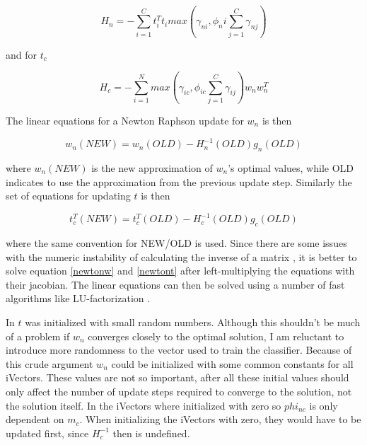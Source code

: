 \begin{equation}\label{jacobianw}
H_n = -\sum_{i=1}^Ct_i^Tt_imax(\gamma_{ni}, \phi_ni\sum_{j=1}^C\gamma_{nj})
\end{equation}

and for $t_c$

\begin{equation}\label{jacobiant}
H_c= -\sum_{i=1}^{N}max(\gamma_{ic}, \phi_{ic}\sum_{j=1}^C\gamma_{ij})w_nw_n^T
\end{equation}

The linear equations for a Newton Raphson update for $w_n$ is then

\begin{equation}\label{newtonw}
w_n(NEW)=w_n(OLD)-H_n^{-1}(OLD)g_n(OLD)
\end{equation}

where $w_n(NEW)$ is the new approximation of $w_n$'s optimal values, while OLD indicates to use the approximation from the previous update step. Similarly the set of equations for updating $t$ is then

\begin{equation}\label{newtont}
t_c^T(NEW)=t_c^T(OLD)-H_c^{-1}(OLD)g_c(OLD)
\end{equation}

where the same convention for NEW/OLD is used. Since there are some issues with the numeric instability of calculating the inverse of a matrix \cite[section 28.4]{cormen}, it is better to solve equation \ref{newtonw} and \ref{newtont} after left-multiplying the equations with their jacobian. The linear equations can then be solved using a number of fast algorithms like LU-factorization \cite[section 20.2]{kreyszig}.

In \cite{liiVector} $t$ was initialized with small random numbers. Although this shouldn't be much of a problem if $w_n$ converges closely to the optimal solution, I am reluctant to introduce more randomness to the vector used to train the classifier. Because of this crude argument $w_n$ could be initialized with some common constants for all iVectors. These values are not so important, after all these initial values should only affect the number of update steps required to converge to the solution, not the solution itself. In \cite{sviVector} the iVectors where initialized with zero so $phi_{nc}$ is only dependent on $m_c$. When initializing the iVectors with zero, they would have to be updated first, since $H_c^{-1}$ then is undefined.

